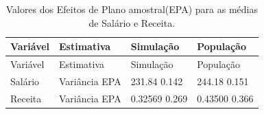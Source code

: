 \documentclass[]{book}
\theoremstyle{definition}
\theoremstyle{definition}
\theoremstyle{definition}
\theoremstyle{remark}
\begin{document}
\begin{longtable}[]{@{}llll@{}}
\caption{\label{tab:eparec}Valores dos Efeitos de Plano amostral(EPA) para
as médias de Salário e Receita.}\tabularnewline
\toprule
\begin{minipage}[b]{0.12\columnwidth}\raggedright\strut
Variável\strut
\end{minipage} & \begin{minipage}[b]{0.15\columnwidth}\raggedright\strut
Estimativa\strut
\end{minipage} & \begin{minipage}[b]{0.14\columnwidth}\raggedright\strut
Simulação\strut
\end{minipage} & \begin{minipage}[b]{0.14\columnwidth}\raggedright\strut
População\strut
\end{minipage}\tabularnewline
\midrule
\endfirsthead
\toprule
\begin{minipage}[b]{0.12\columnwidth}\raggedright\strut
Variável\strut
\end{minipage} & \begin{minipage}[b]{0.15\columnwidth}\raggedright\strut
Estimativa\strut
\end{minipage} & \begin{minipage}[b]{0.14\columnwidth}\raggedright\strut
Simulação\strut
\end{minipage} & \begin{minipage}[b]{0.14\columnwidth}\raggedright\strut
População\strut
\end{minipage}\tabularnewline
\midrule
\endhead
\begin{minipage}[t]{0.12\columnwidth}\raggedright\strut
Salário\strut
\end{minipage} & \begin{minipage}[t]{0.15\columnwidth}\raggedright\strut
Variância EPA\strut
\end{minipage} & \begin{minipage}[t]{0.14\columnwidth}\raggedright\strut
231.84 0.142\strut
\end{minipage} & \begin{minipage}[t]{0.14\columnwidth}\raggedright\strut
244.18 0.151\strut
\end{minipage}\tabularnewline
\begin{minipage}[t]{0.12\columnwidth}\raggedright\strut
Receita\strut
\end{minipage} & \begin{minipage}[t]{0.15\columnwidth}\raggedright\strut
Variância EPA\strut
\end{minipage} & \begin{minipage}[t]{0.14\columnwidth}\raggedright\strut
0.32569 0.269\strut
\end{minipage} & \begin{minipage}[t]{0.14\columnwidth}\raggedright\strut
0.43500 0.366\strut
\end{minipage}\tabularnewline
\bottomrule
\end{longtable}
\end{document}
